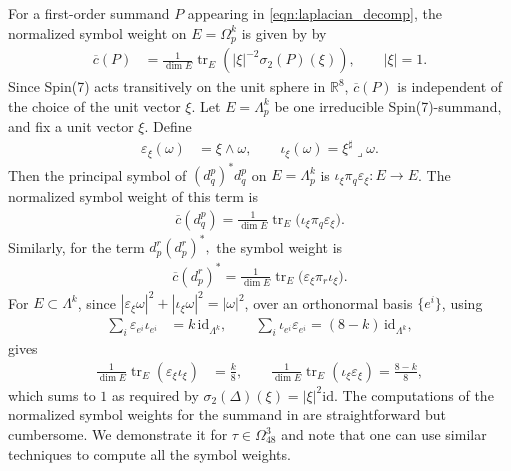 \documentclass[10pt,a4paper,reqno]{article}
\theoremstyle{definition}
\numberwithin{equation}{section}
\begin{document}
For a first-order summand $P$ appearing in \cref{eqn:laplacian_decomp}, the normalized symbol
weight on $E=\Omega^k_p$ is given by by
\begin{align*}
    \overline c(P)&=\frac{1}{\dim E}
\operatorname{tr}_E\left(|\xi|^{-2}\sigma_2(P)(\xi)\right),\qquad |\xi|=1.
\end{align*}
Since Spin(7) acts transitively on the unit sphere in $\mathbb R^8$, $\overline c(P)$ is independent of the choice of the unit vector $\xi$. Let $E=\Lambda^k_p$ be one irreducible Spin(7)-summand, and fix a unit vector $\xi$. Define
\begin{align*}
  \varepsilon_\xi(\omega)&=\xi\wedge \omega,
\qquad
\iota_\xi(\omega)=\xi^\sharp\lrcorner \omega.  
\end{align*}
Then the principal symbol of $(d^p_q)^*d^p_q$ on $E=\Lambda^k_p$ is $\iota_\xi\pi_q\varepsilon_\xi:E\to E$. The normalized symbol weight of this term is
\begin{align*}
    \overline c(d^p_q)
=
\frac1{\dim E}
\operatorname{tr}_E\big(\iota_\xi\pi_q\varepsilon_\xi\big).
\end{align*}
Similarly, for the term $d^r_p(d^r_p)^*,$ the symbol weight is
\begin{align*}
    \overline c(d^r_p)^*=\frac1{\dim E}\operatorname{tr}_E\big(\varepsilon_\xi\pi_r\iota_\xi\big).
\end{align*}
For $E\subset \Lambda^k$, since $|\varepsilon_\xi\omega|^2+|\iota_\xi\omega|^2=|\omega|^2$,
over an orthonormal basis $\{e^i\}$, using
\begin{align*}
    \sum_i \varepsilon_{e^i}\iota_{e^i}&=k\,\mathrm{id}_{\Lambda^k},
\qquad
\sum_i \iota_{e^i}\varepsilon_{e^i}=(8-k)\,\mathrm{id}_{\Lambda^k},
\end{align*} gives
\begin{align}\label{eqn:sum_c}
    \frac1{\dim E}\operatorname{tr}_E(\varepsilon_\xi\iota_\xi)&=\frac{k}{8}, \qquad
    \frac1{\dim E}\operatorname{tr}_E(\iota_\xi\varepsilon_\xi)=\frac{8-k}{8},
\end{align} which sums to $1$ as required by $\sigma_2(\Delta)(\xi)=|\xi|^2\mathrm{id}$.  The computations of the normalized symbol weights for the summand in  are straightforward but cumbersome. We demonstrate it for $\tau\in\Omega^3_{48}$ and note that one can use similar techniques to compute all the symbol weights. 
\end{document}
